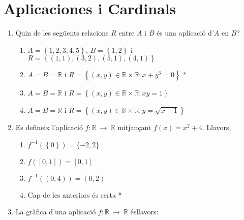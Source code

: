 
\section{Aplicaciones i Cardinals}

\begin{enumerate}
\item Quin de les seg\"{u}ents relacions $R$ entre $A$ i $B$ \'{e}s una
aplicaci\'{o} d'$A$ en $B$?

\begin{enumerate}
\item $A=\left\{ 1,2,3,4,5\right\} $, $B=\left\{ 1,2\right\} $ i $R=\left\{
(1,1),(3,2),(5,1),(4,1)\right\} $

\item $A=B=\mathbb{R}$ i $R=\left\{ (x,y)\in \mathbb{R}\times \mathbb{R}%
:x+y^{3}=0\right\} $ *

\item $A=B=\mathbb{R}$ i $R=\left\{ (x,y)\in\mathbb{R}\times\mathbb{R}%
:xy=1\right\} $

\item $A=B=\mathbb{R}$ i $R=\left\{ (x,y)\in\mathbb{R}\times\mathbb{R}:y=%
\sqrt{x-1}\right\} $
\end{enumerate}

\item Es defineix l'aplicaci\'{o} $f:\mathbb{R}~\longrightarrow~\mathbb{R}$
mitjan\c{c}ant $f(x)=x^{2}+4$. Llavors,

\begin{enumerate}
\item $f^{-1}(\left\{ 0\right\} )=\{-2,2\}$

\item $f\left( [0,1]\right) =[0,1]$

\item $f^{-1}\left( (0,4)\right) =(0,2)$

\item Cap de les anteriors \'{e}s certa *
\end{enumerate}

\item La gr\`{a}fica d'una aplicaci\'{o} $f:\mathbb{R}~\longrightarrow~%
\mathbb{R}$ \'{e}sllavors:


\end{enumerate}
